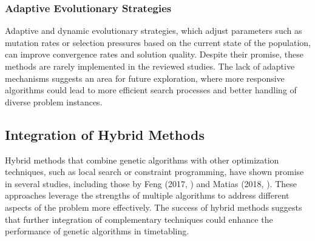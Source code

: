 \documentclass[sigconf]{acmart}
\begin{document}
\subsubsection{Adaptive Evolutionary Strategies}
Adaptive and dynamic evolutionary strategies, which adjust parameters such as
mutation rates or selection pressures based on the current state of the
population, can improve convergence rates and solution quality.
Despite their promise, these methods are rarely implemented in the reviewed
studies. The lack of adaptive mechanisms suggests an area for future
exploration, where more responsive algorithms could lead to more efficient
search processes and better handling of diverse problem instances.



\subsection{Integration of Hybrid Methods}
Hybrid methods that combine genetic algorithms with other optimization
techniques, such as local search or constraint programming, have shown promise
in several studies, including those by Feng (2017, \cite{Feng2017}) and Matias
(2018, \cite{Matias2018fair}). These approaches leverage the strengths of
multiple algorithms to address different aspects of the problem more
effectively. The success of hybrid methods suggests that further integration of
complementary techniques could enhance the performance of genetic algorithms
in timetabling.


\end{document}
